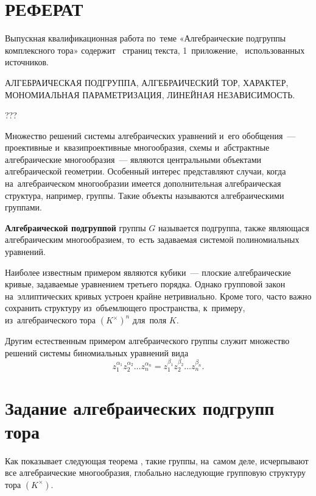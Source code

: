 \documentclass[a4paper,oneside]{article}
\def\title{Алгебраические подгруппы комплексного тора}
\begin{document}
\section*{\centering\MakeUppercase{Реферат}}\thispagestyle{empty}

Выпускная квалификационная работа по~теме «\title»
содержит \pageref{TheEnd}~страниц текста, 1~приложение, ~использованных источников.

\MakeUppercase{Алгебраическая подгруппа, алгебраический тор, характер, мономиальная параметризация,
линейная независимость.}

???

\pagebreak

\renewcommand{\contentsname}{\hfill\bfseries\normalsize\MakeUppercase{Содержание}\hfill}
\renewcommand{\cftaftertoctitle}{\hfill}
\renewcommand{\cftsecleader}{\cftdotfill{\cftdotsep}}
\tableofcontents
\thispagestyle{empty}

\pagebreak

Множество решений системы алгебраических уравнений и его обобщения~— проективные и~квазипроективные многообразия,
схемы и~абстрактные алгебраические многообразия~— являются центральными объектами алгебраической геометрии.
Особенный интерес представляют случаи, когда на~алгебраическом многообразии имеется дополнительная алгебраическая структура,
например, группы. Такие объекты называются алгебраическими группами.

\textbf{Алгебраической подгруппой} группы $G$ называется подгруппа, также являющася
алгебраическим многообразием, то~есть задаваемая системой полиномиальных уравнений.

Наиболее известным примером являются кубики~— плоские алгебраические кривые, задаваемые уравнением третьего порядка.
Однако групповой закон на~эллиптических кривых устроен крайне нетривиально. Кроме того, часто важно сохранить структуру
из~объемлющего пространства, к~примеру, из~алгебраического тора $(K^\times)^n$ для~поля $K$.

Другим естественным примером алгебраического группы служит множество решений системы биномиальных уравнений вида
\[
  z_1^{\alpha_1} z_2^{\alpha_2} \ldots z_n^{\alpha_n} = z_1^{\beta_1} z_2^{\beta_2} \ldots z_n^{\beta_n}.
\]

\section{Задание алгебраических подгрупп тора}
Как показывает следующая теорема \cite{Schm94}, такие группы, на~самом деле, исчерпывают все алгебраические многообразия,
глобально наследующие групповую структуру тора $(K^\times)$.
\end{document}
